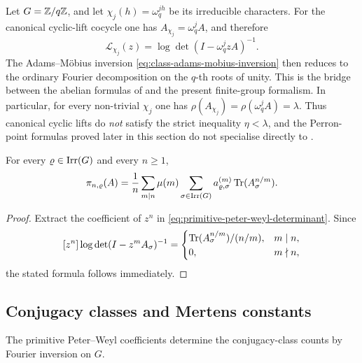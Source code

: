 \begin{remark}
  \label{rem:abelian-toy-model-cyclic}
  Let \(G=\mathbb{Z}/q\mathbb{Z}\), and let \(\chi_j(h)=\omega_q^{jh}\) be its
  irreducible characters. For the canonical cyclic-lift cocycle one has
  \(A_{\chi_j}=\omega_q^jA\), and therefore
  \[
    \mathcal L_{\chi_j}(z)=\log\det(I-\omega_q^j zA)^{-1}.
  \]
  The Adams--M\"obius inversion
  \eqref{eq:class-adams-mobius-inversion} then reduces to the ordinary
  Fourier decomposition on the \(q\)-th roots of unity. This is the
  bridge between the abelian formulas of
   and the present finite-group formalism. In
  particular, for every non-trivial \(\chi_j\) one has
  \(\rho(A_{\chi_j})=\rho(\omega_q^jA)=\lambda\). Thus canonical cyclic
  lifts do \emph{not} satisfy the strict inequality \(\eta<\lambda\),
  and the Perron-point formulas proved later in this section do not
  specialise directly to .
\end{remark}

\begin{corollary}
  \label{cor:primitive-peter-weyl-trace}
  For every \(\varrho\in\operatorname{Irr}(G)\) and every \(n\ge 1\),
  \begin{equation}\label{eq:primitive-peter-weyl-trace}
    \pi_{n,\varrho}(A)
    =
    \frac{1}{n}\sum_{m\mid n}\mu(m)
      \sum_{\sigma\in\operatorname{Irr}(G)}
        a_{\varrho,\sigma}^{(m)}
        \operatorname{Tr}(A_\sigma^{n/m}).
  \end{equation}
\end{corollary}

\begin{proof}
  Extract the coefficient of \(z^n\) in
  \eqref{eq:primitive-peter-weyl-determinant}. Since
  \[
    [z^n]\log\det(I-z^mA_\sigma)^{-1}
    =
    \begin{cases}
      \operatorname{Tr}(A_\sigma^{n/m})/(n/m), & m\mid n, \\
      0, & m\nmid n,
    \end{cases}
  \]
  the stated formula follows immediately.
\end{proof}

\subsection{Conjugacy classes and Mertens constants}

The primitive Peter--Weyl coefficients determine the conjugacy-class
counts by Fourier inversion on \(G\).

